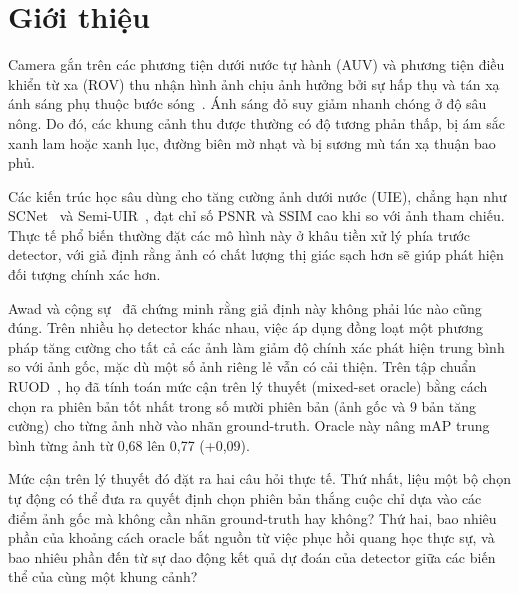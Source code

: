 \documentclass[runningheads]{llncs}
\begin{document}
\section{Giới thiệu}
\label{sec:intro}

Camera gắn trên các phương tiện dưới nước tự hành (AUV) và phương tiện điều khiển từ xa (ROV) thu nhận hình ảnh chịu ảnh hưởng bởi sự hấp thụ và tán xạ ánh sáng phụ thuộc bước sóng~\cite{fuRethinkingGeneralUnderwater2023,liUnderwaterImageEnhancement2019}. Ánh sáng đỏ suy giảm nhanh chóng ở độ sâu nông. Do đó, các khung cảnh thu được thường có độ tương phản thấp, bị ám sắc xanh lam hoặc xanh lục, đường biên mờ nhạt và bị sương mù tán xạ thuận bao phủ.

Các kiến trúc học sâu dùng cho tăng cường ảnh dưới nước (UIE), chẳng hạn như SCNet~\cite{fuUnderwaterImageEnhancement2022} và Semi-UIR~\cite{huangContrastiveSemisupervisedLearning2023}, đạt chỉ số PSNR và SSIM cao khi so với ảnh tham chiếu. Thực tế phổ biến thường đặt các mô hình này ở khâu tiền xử lý phía trước detector, với giả định rằng ảnh có chất lượng thị giác sạch hơn sẽ giúp phát hiện đối tượng chính xác hơn.

Awad và cộng sự~\cite{awadRevisitingUnderwaterImage2026} đã chứng minh rằng giả định này không phải lúc nào cũng đúng. Trên nhiều họ detector khác nhau, việc áp dụng đồng loạt một phương pháp tăng cường cho tất cả các ảnh làm giảm độ chính xác phát hiện trung bình so với ảnh gốc, mặc dù một số ảnh riêng lẻ vẫn có cải thiện. Trên tập chuẩn RUOD~\cite{fuRethinkingGeneralUnderwater2023}, họ đã tính toán mức cận trên lý thuyết (mixed-set oracle) bằng cách chọn ra phiên bản tốt nhất trong số mười phiên bản (ảnh gốc và 9 bản tăng cường) cho từng ảnh nhờ vào nhãn ground-truth. Oracle này nâng mAP trung bình từng ảnh từ 0,68 lên 0,77 (+0,09).

Mức cận trên lý thuyết đó đặt ra hai câu hỏi thực tế. Thứ nhất, liệu một bộ chọn tự động có thể đưa ra quyết định chọn phiên bản thắng cuộc chỉ dựa vào các điểm ảnh gốc mà không cần nhãn ground-truth hay không? Thứ hai, bao nhiêu phần của khoảng cách oracle bắt nguồn từ việc phục hồi quang học thực sự, và bao nhiêu phần đến từ sự dao động kết quả dự đoán của detector giữa các biến thể của cùng một khung cảnh?
\end{document}
